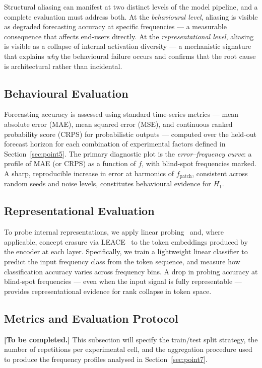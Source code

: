 Structural aliasing can manifest at two distinct levels of the model pipeline, and a complete evaluation must address both.
At the \emph{behavioural level}, aliasing is visible as degraded forecasting accuracy at specific frequencies — a measurable consequence that affects end-users directly.
At the \emph{representational level}, aliasing is visible as a collapse of internal activation diversity — a mechanistic signature that explains \emph{why} the behavioural failure occurs and confirms that the root cause is architectural rather than incidental.

\subsection{Behavioural Evaluation}

Forecasting accuracy is assessed using standard time-series metrics — mean absolute error (MAE), mean squared error (MSE), and continuous ranked probability score (CRPS) for probabilistic outputs — computed over the held-out forecast horizon for each combination of experimental factors defined in Section~\ref{sec:point5}.
The primary diagnostic plot is the \emph{error–frequency curve}: a profile of MAE (or CRPS) as a function of $f$, with blind-spot frequencies marked.
A sharp, reproducible increase in error at harmonics of $f_{\mathrm{patch}}$, consistent across random seeds and noise levels, constitutes behavioural evidence for $H_1$.

\subsection{Representational Evaluation}

To probe internal representations, we apply linear probing~\cite{voitaInformationTheoreticProbingMinimum2020} and, where applicable, concept erasure via LEACE~\cite{belroseLEACEPerfectLinear2023} to the token embeddings produced by the encoder at each layer.
Specifically, we train a lightweight linear classifier to predict the input frequency class from the token sequence, and measure how classification accuracy varies across frequency bins.
A drop in probing accuracy at blind-spot frequencies — even when the input signal is fully representable — provides representational evidence for rank collapse in token space.

\subsection{Metrics and Evaluation Protocol}

\noindent\textbf{[To be completed.]}
This subsection will specify the train/test split strategy, the number of repetitions per experimental cell, and the aggregation procedure used to produce the frequency profiles analysed in Section~\ref{sec:point7}.

